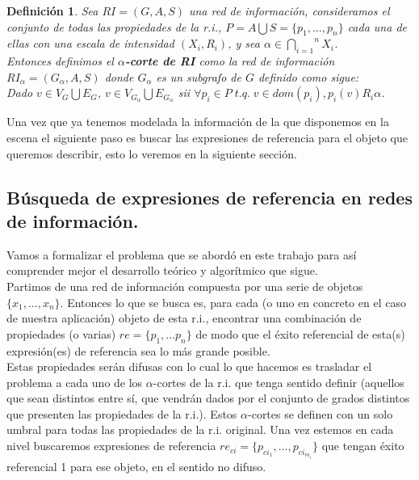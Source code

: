 \documentclass[10pt,a4paper]{article}
\newtheorem{definicion}{Definición}
\begin{document}
\begin{definicion}
Sea $RI = (G,A,S)$ una red de información, consideramos el conjunto de todas las propiedades de la r.i., $P = A \bigcup S = \lbrace p_1, ..., p_n \rbrace$ cada una de ellas con una escala de intensidad $(X_i, R_i)$, y sea $\alpha \in \overset{n}{\underset{i = 1}{\bigcap}} X_i$.\\

Entonces definimos el \textbf{$\alpha$-corte de RI} como la red de información $RI_{\alpha} = (G_\alpha, A, S)$ donde $G_\alpha$ es un subgrafo de $G$ definido como sigue:\\

Dado $v \in V_G \bigcup E_G$, $v \in V_{G_\alpha} \bigcup E_{G_\alpha}$ sii $\forall p_i \in P \; t.q. \; v \in dom(p_i), p_i(v) R_i \alpha$.
\end{definicion}

Una vez que ya tenemos modelada la información de la que disponemos en la escena el siguiente paso es buscar las expresiones de referencia para el objeto que queremos describir, esto lo veremos en la siguiente sección.

\subsection{Búsqueda de expresiones de referencia en redes de información.}

Vamos a formalizar el problema que se abordó en este trabajo para así comprender mejor el desarrollo teórico y algorítmico que sigue.\\

Partimos de una red de información compuesta por una serie de objetos $\lbrace x_1, ..., x_n\rbrace$. Entonces lo que se busca es, para cada (o uno en concreto en el caso de nuestra aplicación) objeto de esta r.i., encontrar una combinación de propiedades (o varias) $re = \lbrace p_1, ... p_n \rbrace$ de modo que el éxito referencial de esta(s) expresión(es) de referencia sea lo más grande posible.\\

Estas propiedades serán difusas con lo cual lo que hacemos es trasladar el problema a cada uno de los $\alpha$-cortes de la r.i. que tenga sentido definir (aquellos que sean distintos entre sí, que vendrán dados por el conjunto de grados distintos que presenten las propiedades de la r.i.). Estos $\alpha$-cortes se definen con un solo umbral para todas las propiedades de la r.i. original. Una vez estemos en cada nivel buscaremos expresiones de referencia $re_{ci} = \lbrace p_{ci_1}, ..., p_{ci_{m_i}} \rbrace$ que tengan éxito referencial 1 para ese objeto, en el sentido no difuso.\\
\end{document}

